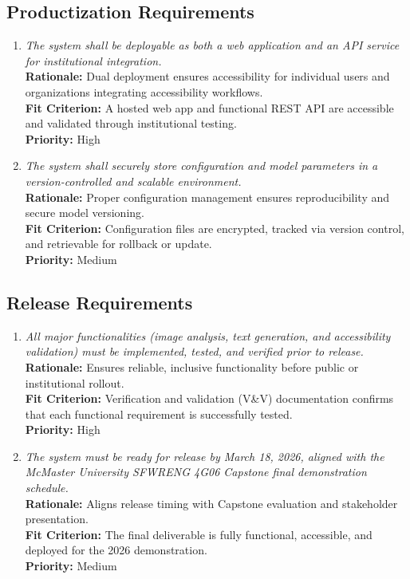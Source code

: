 \documentclass[12pt]{article}
\begin{document}
\subsection{Productization Requirements}

\begin{enumerate}[label=OER-PR\arabic*., wide=0pt, leftmargin=*]
  \item \emph{The system shall be deployable as both a web application and an API service for institutional integration.}\\[2mm]
    {\bf Rationale:} Dual deployment ensures accessibility for individual users and organizations integrating accessibility workflows.\\
    {\bf Fit Criterion:} A hosted web app and functional REST API are accessible and validated through institutional testing.\\
    {\bf Priority:} High

  \item \emph{The system shall securely store configuration and model parameters in a version-controlled and scalable environment.}\\[2mm]
    {\bf Rationale:} Proper configuration management ensures reproducibility and secure model versioning.\\
    {\bf Fit Criterion:} Configuration files are encrypted, tracked via version control, and retrievable for rollback or update.\\
    {\bf Priority:} Medium
\end{enumerate}

\subsection{Release Requirements}

\begin{enumerate}[label=OER-RL\arabic*., wide=0pt, leftmargin=*]
  \item \emph{All major functionalities (image analysis, text generation, and accessibility validation) must be implemented, tested, and verified prior to release.}\\[2mm]
    {\bf Rationale:} Ensures reliable, inclusive functionality before public or institutional rollout.\\
    {\bf Fit Criterion:} Verification and validation (V\&V) documentation confirms that each functional requirement is successfully tested.\\
    {\bf Priority:} High

  \item \emph{The system must be ready for release by March 18, 2026, aligned with the McMaster University SFWRENG 4G06 Capstone final demonstration schedule.}\\[2mm]
    {\bf Rationale:} Aligns release timing with Capstone evaluation and stakeholder presentation.\\
    {\bf Fit Criterion:} The final deliverable is fully functional, accessible, and deployed for the 2026 demonstration.\\
    {\bf Priority:} Medium
\end{enumerate}
\end{document}
